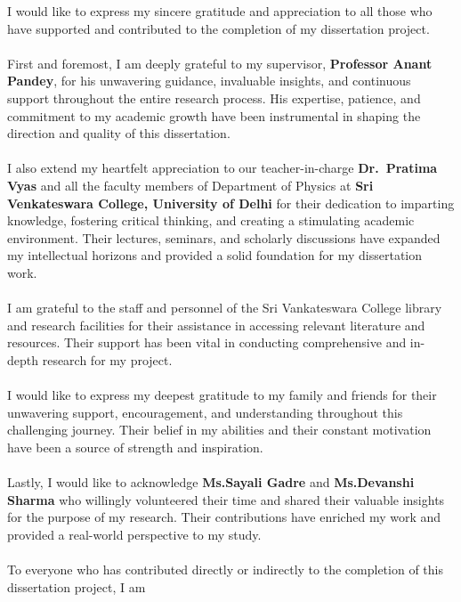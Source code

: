 \documentclass[../Report.tex]{subfiles}
\begin{document}
    \vspace{1cm}
    \large
    I would like to express my sincere gratitude and appreciation to all those who have supported and 
    contributed to the completion of my dissertation project.
    \\~\\
    \noindent First and foremost, I am deeply grateful to my supervisor, \textbf{Professor Anant Pandey}, for his 
    unwavering guidance, invaluable insights, and continuous support throughout the entire research process. 
    His expertise, patience, and commitment to my academic growth have been instrumental in shaping the direction 
    and quality of this dissertation.
    \\~\\
    \noindent I also extend my heartfelt appreciation to our teacher-in-charge \textbf{Dr.\ Pratima Vyas} and all 
    the faculty members of Department of Physics at \textbf{Sri Venkateswara College, University of Delhi} for their 
    dedication to imparting knowledge, fostering critical thinking, and creating a stimulating academic environment.
    Their lectures, seminars, and scholarly discussions have expanded my intellectual horizons and provided a solid 
    foundation for my dissertation work.
    \\~\\
    \noindent 
    I am grateful to the staff and personnel of the Sri Vankateswara College library and research facilities for their 
    assistance in accessing relevant literature and resources. Their support has been vital in conducting 
    comprehensive and in-depth research for my project.
    \\~\\
    \noindent 
    I would like to express my deepest gratitude to my family and friends for their unwavering support, 
    encouragement, and understanding throughout this challenging journey. Their belief in my abilities and their 
    constant motivation have been a source of strength and inspiration.
    \\~\\
    \noindent 
    Lastly, I would like to acknowledge \textbf{Ms.Sayali Gadre} and \textbf{Ms.Devanshi Sharma} who willingly 
    volunteered their time and shared their valuable insights for the purpose of my research. Their contributions 
    have enriched my work and provided a real-world perspective to my study.
    \\~\\
    \noindent 
    To everyone who has contributed directly or indirectly to the completion of this dissertation project, I am 
\end{document}
